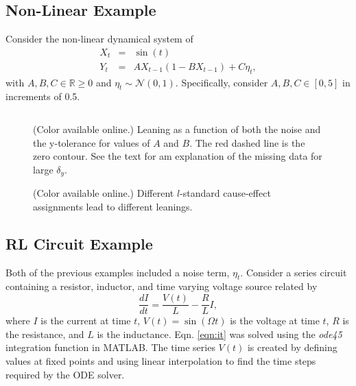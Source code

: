 \documentclass[a4paper,11pt,twocolumn]{article}
\begin{document}
\subsection{Non-Linear Example}
Consider the non-linear dynamical system of
\begin{eqnarray}
\label{eqn:nonlinearEX}
X_t &=& \sin(t)\\
Y_t &=& AX_{t-1}\left(1-BX_{t-1}\right)+C\eta_t,
\end{eqnarray}
with $A,B,C\in\mathbb{R}\ge 0$ and $\eta_t\sim\mathcal{N}\left(0,1\right)$.  Specifically, consider $A,B,C\in[0,5]$ in increments of 0.5.
\begin{figure}[ht]
\begin{tabular}{cc}
\end{tabular}
\caption{(Color available online.) Leaning as a function of both the noise and the y-tolerance for values of $A$ and $B$.  The red dashed line is the zero contour.  See the text for am explanation of the missing data for large $\delta_y$.}
\end{figure}
\begin{figure}[ht]
\caption{(Color available online.) Different $l$-standard cause-effect assignments lead to different leanings.}
\end{figure}  

\subsection{RL Circuit Example}
\label{sec:rlcirc}
Both of the previous examples included a noise term, $\eta_t$.  Consider a series circuit containing a resistor, inductor, and time varying voltage source related by
\begin{equation}
\label{eqn:it}
\frac{dI}{dt} = \frac{V(t)}{L} - \frac{R}{L} I,
\end{equation}
where $I$ is the current at time $t$, $V(t)= \sin\left(\Omega t\right)$ is the voltage at time $t$, $R$ is the resistance, and $L$ is the inductance.  Eqn. \ref{eqn:it} was solved using the {\em ode45} integration function in MATLAB.  The time series $V(t)$ is created by defining values at fixed points and using linear interpolation to find the time steps required by the ODE solver.  
\end{document}
